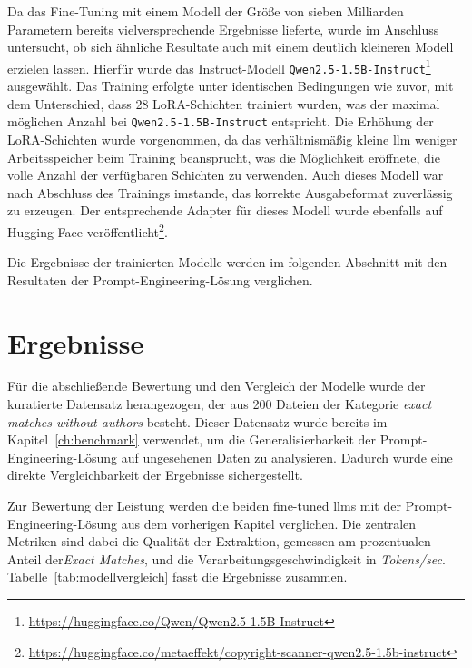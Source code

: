 Da das Fine-Tuning mit einem Modell der Größe von sieben Milliarden Parametern bereits vielversprechende Ergebnisse lieferte, wurde im Anschluss untersucht, ob sich ähnliche Resultate auch mit einem deutlich kleineren Modell erzielen lassen.
Hierfür wurde das Instruct-Modell \texttt{Qwen2.5-1.5B-Instruct}\footnote{\url{https://huggingface.co/Qwen/Qwen2.5-1.5B-Instruct}} ausgewählt.
Das Training erfolgte unter identischen Bedingungen wie zuvor, mit dem Unterschied, dass 28 LoRA-Schichten trainiert wurden, was der maximal möglichen Anzahl bei \texttt{Qwen2.5-1.5B-Instruct} entspricht.
Die Erhöhung der LoRA-Schichten wurde vorgenommen, da das verhältnismäßig kleine \gls{llm} weniger Arbeitsspeicher beim Training beansprucht, was die Möglichkeit eröffnete, die volle Anzahl der verfügbaren Schichten zu verwenden.
Auch dieses Modell war nach Abschluss des Trainings imstande, das korrekte Ausgabeformat zuverlässig zu erzeugen.
Der entsprechende Adapter für dieses Modell wurde ebenfalls auf Hugging Face veröffentlicht\footnote{\url{https://huggingface.co/metaeffekt/copyright-scanner-qwen2.5-1.5b-instruct}}.

Die Ergebnisse der trainierten Modelle werden im folgenden Abschnitt mit den Resultaten der Prompt-Engineering-Lösung verglichen.

\section{Ergebnisse}\label{sec:lora-ergebnisse}

Für die abschließende Bewertung und den Vergleich der Modelle wurde der kuratierte Datensatz herangezogen, der aus \num{200} Dateien der Kategorie \textit{exact matches without authors} besteht.
Dieser Datensatz wurde bereits im Kapitel~\ref{ch:benchmark} verwendet, um die Generalisierbarkeit der Prompt-Engineering-Lösung auf ungesehenen Daten zu analysieren.
Dadurch wurde eine direkte Vergleichbarkeit der Ergebnisse sichergestellt.

Zur Bewertung der Leistung werden die beiden fine-tuned \glspl{llm} mit der Prompt-Engineering-Lösung aus dem vorherigen Kapitel verglichen.
Die zentralen Metriken sind dabei die Qualität der Extraktion, gemessen am prozentualen Anteil der\textit{Exact Matches}, und die Verarbeitungsgeschwindigkeit in \textit{Tokens/sec}.
Tabelle~\ref{tab:modellvergleich} fasst die Ergebnisse zusammen.

